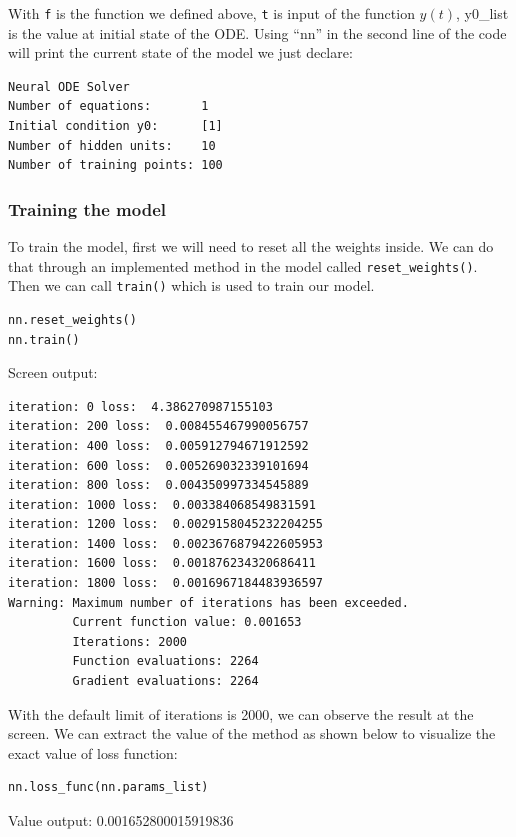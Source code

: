 \documentclass[a4paper]{article}
\numberwithin{equation}{section}
\begin{document}
With \texttt{f} is the function we defined above, \texttt{t} is input of the function \( y(t) \), y0\_list is the value at initial state of the ODE. Using ``nn'' in the second line of the code will print the current state of the model we just declare:
\begin{mdframed}[leftline=false,rightline=false,backgroundcolor=Turquoise!10,nobreak=true]
  \begin{verbatim}
Neural ODE Solver
Number of equations:       1
Initial condition y0:      [1]
Number of hidden units:    10
Number of training points: 100
    \end{verbatim}
\end{mdframed}

\subsubsection{Training the model}
To train the model, first we will need to reset all the weights inside. We can do that through an implemented method in the model called \texttt{reset\_weights()}. Then we can call \texttt{train()} which is used to train our model.
\begin{mdframed}[leftline=false,rightline=false,backgroundcolor=magenta!10,nobreak=true]
  \begin{verbatim}
nn.reset_weights()
nn.train()
    \end{verbatim}
\end{mdframed}
Screen output:
\begin{mdframed}[leftline=false,rightline=false,backgroundcolor=Turquoise!10,nobreak=true]
  \begin{verbatim}
iteration: 0 loss:  4.386270987155103
iteration: 200 loss:  0.008455467990056757
iteration: 400 loss:  0.005912794671912592
iteration: 600 loss:  0.005269032339101694
iteration: 800 loss:  0.004350997334545889
iteration: 1000 loss:  0.003384068549831591
iteration: 1200 loss:  0.0029158045232204255
iteration: 1400 loss:  0.0023676879422605953
iteration: 1600 loss:  0.001876234320686411
iteration: 1800 loss:  0.0016967184483936597
Warning: Maximum number of iterations has been exceeded.
         Current function value: 0.001653
         Iterations: 2000
         Function evaluations: 2264
         Gradient evaluations: 2264
    \end{verbatim}
\end{mdframed}
With the default limit of iterations is 2000, we can observe the result at the screen. We can extract the value of the method as shown below to visualize the exact value of loss function:
\begin{mdframed}[leftline=false,rightline=false,backgroundcolor=magenta!10,nobreak=true]
  \begin{verbatim}
nn.loss_func(nn.params_list)
    \end{verbatim}
\end{mdframed}
Value output: 0.001652800015919836
\end{document}
